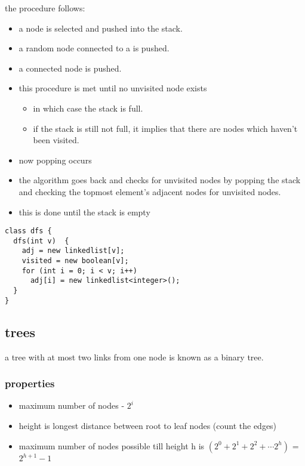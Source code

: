 \documentclass[11pt]{article}
\begin{document}
\begin{enumerate}
the procedure follows:
\begin{itemize}
\item a node is selected and pushed into the stack.
\item a random node connected to a is pushed.
\item a connected node is pushed.
\item this procedure is met until no unvisited node exists
\begin{itemize}
\item in which case the stack is full.
\item if the stack is still not full, it implies that there are nodes which haven't been visited.
\end{itemize}
\item now popping occurs
\item the algorithm goes back and checks for unvisited nodes by popping the stack and checking the topmost element's adjacent nodes for unvisited nodes.
\item this is done until the stack is empty
\end{itemize}

\begin{verbatim}
class dfs {
  dfs(int v)  {
    adj = new linkedlist[v];
    visited = new boolean[v];
    for (int i = 0; i < v; i++)
      adj[i] = new linkedlist<integer>();
  }
}
\end{verbatim}
\end{enumerate}
\subsection{trees}
\label{sec:org850041e}

a tree with at most two links from one node is known as a binary tree.
\subsubsection{properties}
\label{sec:orgfdf15ff}
\begin{itemize}
\item maximum number of nodes - \(2^i\)
\item height is longest distance between root to leaf nodes (count the edges)
\item maximum number of nodes possible till height h is \((2^0 + 2^1 + 2^2 + \cdots 2^h)\) = \(2^{h+1} -1\)
\end{itemize}
\end{document}
